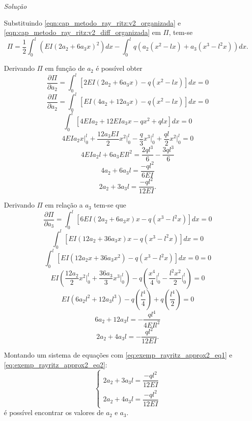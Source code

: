 \documentclass[
	12pt,				%
	openright,			%
    twoside,			%
	a4paper,			%
	chapter=TITLE,		%
	english,			%
	french,				%
	spanish,			%
	brazil				%
	]{abntex2}
\makeatletter
\renewenvironment{proof}[1][\proofname]{
	\par\pushQED{\qed}%
	\normalfont \topsep6\p@\@plus6\p@\relax
	\trivlist
	\item\relax
		{\itshape
			#1\@addpunct{.}}\hspace\labelsep\ignorespaces
}{%
	\popQED\endtrivlist\@endpefalse
}
\newenvironment{solution}{
	\begin{proof}[Solução]
}{%
	\end{proof}
}
\numberwithin{lema}{chapter}
\numberwithin{teorema}{chapter}
\numberwithin{definicao}{chapter}
\numberwithin{exemplo}{chapter}
\numberwithin{figure}{chapter}
\makeatother
\begin{document}
\begin{solution}
	Substituindo \eqref{eqn:cap_metodo_ray_ritz:v2_organizada} e \eqref{eqn:cap_metodo_ray_ritz:v2_diff_organizada} em $\Pi$, tem-se
	$$
		\Pi=
		\frac{1}{2}
		\int_0^l
			\left (
				EI(2a_2+6a_3x)^2
			\right ) dx
		-
		\int_0^l
			q
			\left (
				a_2(x^2-lx)
				+
				a_3(x^3-l^2x)
			\right ) dx
		\text{.}
	$$
	
	Derivando $\Pi$ em função de $a_2$ é possível obter
	$$
		\frac{\partial \Pi}{\partial a_2}
		=
		\int_0^l \left [
			2EI(2a_2+6a_3x)-q(x^2-lx)
		\right ] dx
		= 0
	$$	
	$$
		\frac{\partial \Pi}{\partial a_2}
		=
		\int_0^l \left [
			EI(4a_2+12a_3x)-q(x^2-lx)
		\right ] dx
		= 0
	$$
	$$
		\int_0^l \left [
			4EIa_2 + 12EIa_3x - qx^2 + qlx
		\right ] dx
		= 0
	$$
	$$
		4EIa_2 x \Big |_0^l
		+
		\frac{12a_3EI}{2} x^2 \Big |_0^l
		-
		\frac{q}{3} x^3 \Big |_0^l
		+
		\frac{ql}{2} x^2 \Big |_0^l
		= 0
	$$
	$$
		4EIa_2l
		+
		6a_3EIl^2
		=
		\frac{2ql^3}{6}
		-
		\frac{3ql^3}{6}
	$$
	$$
		4a_2 + 6a_3l
		=
		\frac{-ql^2}{6EI}
	$$
	\begin{equation}
		\label{eq:exemp_rayritz_approx2_eq1}
		2a_2 + 3a_3l
		=
		\frac{-ql^2}{12EI}
		\text{.}
	\end{equation}
	
	Derivando $\Pi$ em relação a $a_3$ tem-se que
	$$
		\frac{\partial \Pi}{\partial a_3}
		=
		\int_0^l \left [
			6EI(2a_2 + 6a_3x)x
			-
			q(x^3 - l^2x)
		\right ] dx
		= 0
	$$
	$$
		\int_0^l \left [
			EI(12a_2 + 36a_3x)x
			-
			q(x^3 - l^2x)
		\right ] dx
		= 0
	$$
	$$
		\int_0^l \left [
			EI(12a_2 x + 36a_3x^2)
			-
			q(x^3 - l^2x)
		\right ] dx = 0
		= 0
	$$
	$$
		EI \left (
			\frac{12a_2}{2}x^2 \Big |_0^l
			+
			\frac{36a_3}{3}x^3 \Big |_0^l
		\right )
		-
		q \left (
			\frac{x^4}{4} \Big |_0^l
			-
			\frac{l^2x^2}{2} \Big |_0^l
		\right )
		= 0
	$$
	$$
		EI(6a_2l^2 + 12a_3l^3)
		-
		q \left (
			\frac{l^4}{4}
		\right )
		+
		q \left (
			\frac{l^4}{2}
		\right )
		=0
	$$
	$$
		6a_2 + 12a_3l = -\frac{ql^4}{4EIl^2}
	$$
	\begin{equation}
		\label{eq:exemp_rayritz_approx2_eq2}
		2a_2 + 4a_3l = -\frac{ql^2}{12EI}
		\text{.}
	\end{equation}
	
	Montando um sistema de equações com \eqref{eq:exemp_rayritz_approx2_eq1} e \eqref{eq:exemp_rayritz_approx2_eq2}:
	\begin{equation}
		\label{eqn:ex_rayritz_sistema_2}
		\begin{cases}
			2a_2+3a_3l=\dfrac{-ql^2}{12EI}\\[10pt]
			2a_2+4a_3l=\dfrac{-ql^2}{12EI}
		\end{cases}
	\end{equation}
	é possível encontrar os valores de $a_2$ e $a_3$. 
	

\end{solution}
\end{document}
